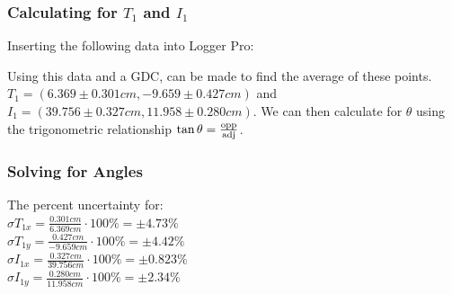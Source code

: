 \documentclass[12pt]{article}
\begin{document}
\subsubsection{Calculating for $T_{1}$ and $I_{1}$}
Inserting the following data into Logger Pro:
\begin{center}
\begin{figure}[H]
\centering
{}
\end{figure}
\end{center}
Using this data and a GDC, can be made to find the average of these points. $T_{1} = (6.369\pm0.301cm, -9.659\pm0.427cm)$ and $I_{1} = (39.756\pm0.327cm, 11.958\pm0.280cm)$. We can then calculate for $\theta{}$ using the trigonometric relationship $\tan{\theta{}} = \ce{\frac{opp}{adj}}$.

\pagebreak
\subsubsection{Solving for Angles}
The percent uncertainty for:\\
$\sigma{}T_{1x} = \frac{0.301cm}{6.369cm} \cdot{} 100\% = \pm4.73\%$\\
$\sigma{}T_{1y} = \frac{0.427cm}{-9.659cm} \cdot{} 100\% = \pm4.42\%$\\
$\sigma{}I_{1x} = \frac{0.327cm}{39.756cm} \cdot{} 100\% = \pm0.823\%$\\
$\sigma{}I_{1y} = \frac{0.280cm}{11.958cm} \cdot{} 100\% = \pm2.34\%$
\end{document}
